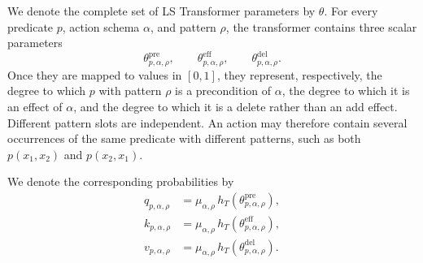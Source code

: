 We denote the complete set of LS Transformer parameters by $\theta$.
For every predicate $p$, action schema $\alpha$, and pattern $\rho$, the transformer contains three scalar parameters
\begin{equation}
\theta^{\mathrm{pre}}_{p,\alpha,\rho},
\qquad
\theta^{\mathrm{eff}}_{p,\alpha,\rho},
\qquad
\theta^{\mathrm{del}}_{p,\alpha,\rho}.
\end{equation}
Once they are mapped to values in $[0,1]$, they represent, respectively, the degree to which $p$ with pattern $\rho$ is a precondition of $\alpha$, the degree to which it is an effect of $\alpha$, and the degree to which it is a delete rather than an add effect.
Different pattern slots are independent.
An action may therefore contain several occurrences of the same predicate with different patterns, such as both $p(x_1,x_2)$ and $p(x_2,x_1)$.


We denote the corresponding probabilities by
\begin{equation}
\begin{aligned}
q_{p,\alpha,\rho}
&=
\mu_{\alpha,\rho}\,
h_T\!\left(\theta^{\mathrm{pre}}_{p,\alpha,\rho}\right),\\
k_{p,\alpha,\rho}
&=
\mu_{\alpha,\rho}\,
h_T\!\left(\theta^{\mathrm{eff}}_{p,\alpha,\rho}\right),\\
v_{p,\alpha,\rho}
&=
\mu_{\alpha,\rho}\,
h_T\!\left(\theta^{\mathrm{del}}_{p,\alpha,\rho}\right).
\end{aligned}
\label{eq:strips-pattern-probs}
\end{equation}

